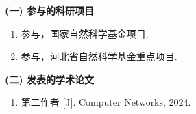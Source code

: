 \makeatletter
{}
  \pagestyle{fancy}%
  \fancyhf{}
\makeatother

\begin{achievement}

{\noindent\textbf{(一) 参与的科研项目}}    %
\begin{enumerate}\setlength{\itemsep}{-0.4em}%
\renewcommand{\labelenumi}{[\theenumi]}
\item 参与，国家自然科学基金项目.
\item 参与，河北省自然科学基金重点项目.
\end{enumerate}


{\noindent\textbf{(二) 发表的学术论文}}    %
\begin{enumerate}\setlength{\itemsep}{-0.4em}%
\renewcommand{\labelenumi}{[\theenumi]}
\item 第二作者  [J]. Computer Networks, 2024.
\end{enumerate}





\end{achievement}
